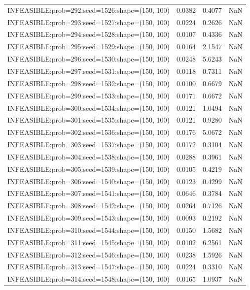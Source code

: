 \begin{longtable}{lccc}
INFEASIBLE:prob=292:seed=1526:shape=(150, 100) & 0.0382 &  0.4077 &    NaN \\
INFEASIBLE:prob=293:seed=1527:shape=(150, 100) & 0.0224 &  0.2626 &    NaN \\
INFEASIBLE:prob=294:seed=1528:shape=(150, 100) & 0.0107 &  0.4336 &    NaN \\
INFEASIBLE:prob=295:seed=1529:shape=(150, 100) & 0.0164 &  2.1547 &    NaN \\
INFEASIBLE:prob=296:seed=1530:shape=(150, 100) & 0.0248 &  5.6243 &    NaN \\
INFEASIBLE:prob=297:seed=1531:shape=(150, 100) & 0.0118 &  0.7311 &    NaN \\
INFEASIBLE:prob=298:seed=1532:shape=(150, 100) & 0.0100 &  0.6679 &    NaN \\
INFEASIBLE:prob=299:seed=1533:shape=(150, 100) & 0.0171 &  0.6672 &    NaN \\
INFEASIBLE:prob=300:seed=1534:shape=(150, 100) & 0.0121 &  1.0494 &    NaN \\
INFEASIBLE:prob=301:seed=1535:shape=(150, 100) & 0.0121 &  0.9280 &    NaN \\
INFEASIBLE:prob=302:seed=1536:shape=(150, 100) & 0.0176 &  5.0672 &    NaN \\
INFEASIBLE:prob=303:seed=1537:shape=(150, 100) & 0.0172 &  0.3104 &    NaN \\
INFEASIBLE:prob=304:seed=1538:shape=(150, 100) & 0.0288 &  0.3961 &    NaN \\
INFEASIBLE:prob=305:seed=1539:shape=(150, 100) & 0.0105 &  0.4219 &    NaN \\
INFEASIBLE:prob=306:seed=1540:shape=(150, 100) & 0.0123 &  0.4299 &    NaN \\
INFEASIBLE:prob=307:seed=1541:shape=(150, 100) & 0.0646 &  0.3784 &    NaN \\
INFEASIBLE:prob=308:seed=1542:shape=(150, 100) & 0.0264 &  0.7126 &    NaN \\
INFEASIBLE:prob=309:seed=1543:shape=(150, 100) & 0.0093 &  0.2192 &    NaN \\
INFEASIBLE:prob=310:seed=1544:shape=(150, 100) & 0.0150 &  1.5682 &    NaN \\
INFEASIBLE:prob=311:seed=1545:shape=(150, 100) & 0.0102 &  6.2561 &    NaN \\
INFEASIBLE:prob=312:seed=1546:shape=(150, 100) & 0.0238 &  1.5926 &    NaN \\
INFEASIBLE:prob=313:seed=1547:shape=(150, 100) & 0.0224 &  0.3310 &    NaN \\
INFEASIBLE:prob=314:seed=1548:shape=(150, 100) & 0.0165 &  1.0937 &    NaN \\

\end{longtable}
